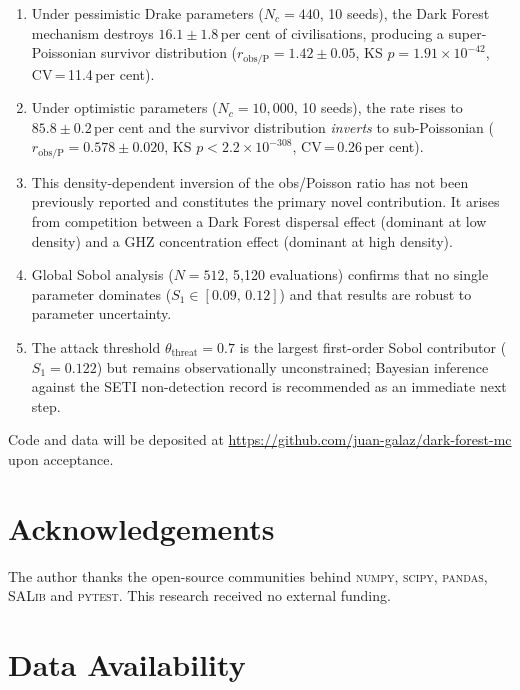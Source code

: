 \documentclass[useAMS,usenatbib]{mn2e}
\begin{document}
\begin{enumerate}
  \item Under pessimistic Drake parameters ($N_c = 440$, 10 seeds),
        the Dark Forest mechanism destroys $16.1 \pm 1.8$\,per cent
        of civilisations, producing a super-Poissonian survivor
        distribution ($r_\text{obs/P} = 1.42\pm0.05$,
        KS $p = 1.91\times10^{-42}$, CV\,=\,11.4\,per cent).

  \item Under optimistic parameters ($N_c = 10{,}000$, 10 seeds),
        the rate rises to $85.8 \pm 0.2$\,per cent and the
        survivor distribution \emph{inverts} to sub-Poissonian
        ($r_\text{obs/P} = 0.578\pm0.020$,
        KS $p < 2.2\times10^{-308}$, CV\,=\,0.26\,per cent).

  \item This density-dependent inversion of the obs/Poisson ratio
        has not been previously reported and constitutes the
        primary novel contribution.
        It arises from competition between a Dark Forest dispersal
        effect (dominant at low density) and a GHZ concentration
        effect (dominant at high density).

  \item Global Sobol analysis ($N=512$, 5{,}120 evaluations)
        confirms that no single parameter dominates
        ($S_1 \in [0.09,\,0.12]$) and that results are robust
        to parameter uncertainty.

  \item The attack threshold $\theta_\text{threat} = 0.7$ is
        the largest first-order Sobol contributor ($S_1 = 0.122$)
        but remains observationally unconstrained; Bayesian
        inference against the SETI non-detection record is
        recommended as an immediate next step.
\end{enumerate}

Code and data will be deposited at
\url{https://github.com/juan-galaz/dark-forest-mc}
upon acceptance.

\section*{Acknowledgements}

The author thanks the open-source communities behind
\textsc{numpy}, \textsc{scipy}, \textsc{pandas}, \textsc{SALib}
and \textsc{pytest}.
This research received no external funding.

\section*{Data Availability}
\end{document}
